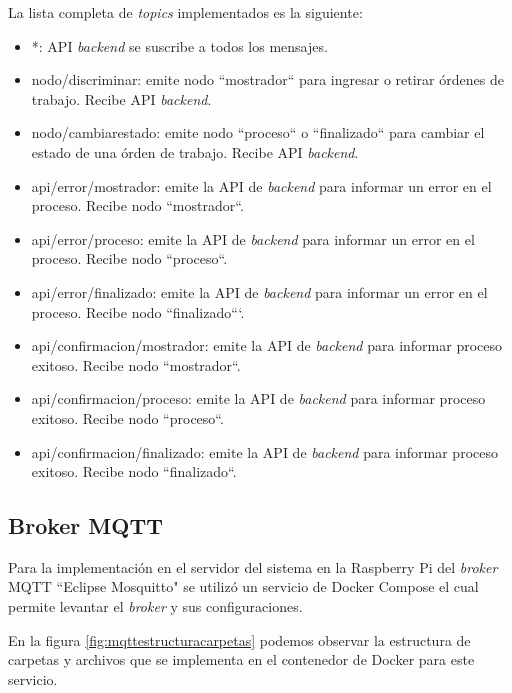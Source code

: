 La lista completa de \textit{topics} implementados es la siguiente:
\begin{itemize}
\item *: API \textit{backend} se suscribe a todos los mensajes.
\item nodo/discriminar: emite nodo ``mostrador`` para ingresar o retirar órdenes de trabajo. Recibe API \textit{backend}.
\item nodo/cambiarestado: emite nodo ``proceso`` o ``finalizado`` para cambiar el estado de una órden de trabajo. Recibe API \textit{backend}.
\item api/error/mostrador: emite la API de \textit{backend} para informar un error en el proceso. Recibe nodo ``mostrador``.
\item api/error/proceso: emite la API de \textit{backend} para informar un error en el proceso. Recibe nodo ``proceso``.
\item api/error/finalizado: emite la API de \textit{backend} para informar un error en el proceso. Recibe nodo ``finalizado```.
\item api/confirmacion/mostrador: emite la API de \textit{backend} para informar proceso exitoso. Recibe nodo ``mostrador``.
\item api/confirmacion/proceso: emite la API de \textit{backend} para informar proceso exitoso. Recibe nodo ``proceso``.
\item api/confirmacion/finalizado: emite la API de \textit{backend} para informar proceso exitoso. Recibe nodo ``finalizado``.

\end{itemize}

\subsection{Broker MQTT}
\label{subsec:mqttbroker}

Para la implementación en el servidor del sistema en la Raspberry Pi del \textit{broker} MQTT ``Eclipse Mosquitto" se utilizó un servicio de Docker Compose el cual permite levantar el \textit{broker} y sus configuraciones.

En la figura \ref{fig:mqttestructuracarpetas} podemos observar la estructura de carpetas y archivos que se implementa en el contenedor de Docker para este servicio. 

